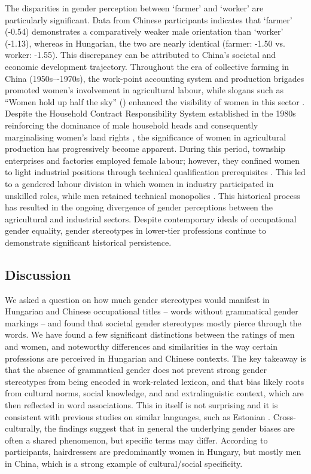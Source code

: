 \documentclass[10pt, a4paper]{article}
\newcommand{\zh}[1]{\simplifiedchinesefont{#1}\rmfamily}
\begin{document}

The disparities in gender perception between `farmer' and `worker' are particularly significant. Data from Chinese participants indicates that `farmer' (-0.54) demonstrates a comparatively weaker male orientation than `worker' (-1.13), whereas in Hungarian, the two are nearly identical (farmer: -1.50 vs. worker: -1.55). This discrepancy can be attributed to China’s societal and economic development trajectory. Throughout the era of collective farming in China (1950s–-1970s), the work-point accounting system and production brigades promoted women's involvement in agricultural labour, while slogans such as ``Women hold up half the sky'' (\zh{妇女能顶半边天}) enhanced the visibility of women in this sector \citep{jacka_1997_agriculture,jacka_1997_domestic}. Despite the Household Contract Responsibility System established in the 1980s reinforcing the dominance of male household heads and consequently marginalising women's land rights \citep{zhu_2009_gender}, the significance of women in agricultural production has progressively become apparent. During this period, township enterprises and factories employed female labour; however, they confined women to light industrial positions through technical qualification prerequisites \citep{liu_2007_gender}. This led to a gendered labour division in which women in industry participated in unskilled roles, while men retained technical monopolies \citep{bossen_2002_chinese}. This historical process has resulted in the ongoing divergence of gender perceptions between the agricultural and industrial sectors. Despite contemporary ideals of occupational gender equality, gender stereotypes in lower-tier professions continue to demonstrate significant historical persistence.


\subsection{Discussion}\label{sec:discussion}

We asked a question on how much gender stereotypes would manifest in Hungarian and Chinese occupational titles -- words without grammatical gender markings -- and found that societal gender stereotypes mostly pierce through the words. We have found a few significant distinctions between the ratings of men and women, and noteworthy differences and similarities in the way certain professions are perceived in Hungarian and Chinese contexts. The key takeaway is that the absence of grammatical gender does not prevent strong gender stereotypes from being encoded in work-related lexicon, and that bias likely roots from cultural norms, social knowledge, and and extralinguistic context, which are then reflected in word associations. This in itself is not surprising and it is consistent with previous studies on similar languages, such as Estonian \citet{kaukonen_2025_gender}. Cross-culturally, the findings suggest that in general the underlying gender biases are often a shared phenomenon, but specific terms may differ. According to participants, hairdressers are predominantly women in Hungary, but mostly men in China, which is a strong example of cultural/social specificity.
\end{document}
